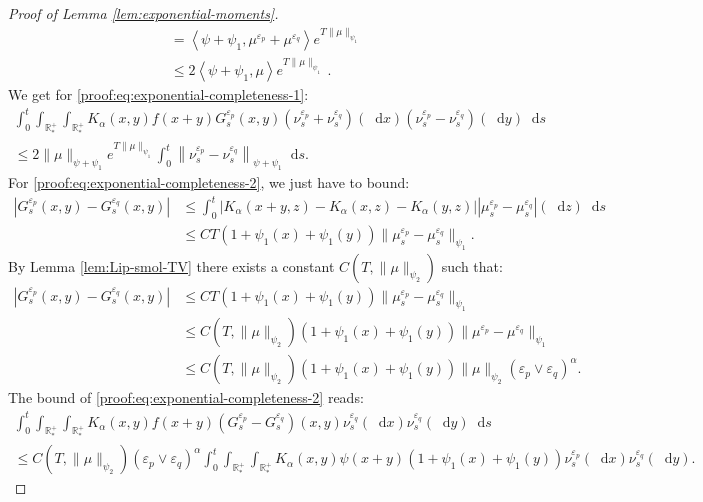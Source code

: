 \documentclass[11pt,a4paper]{article}
\newcommand{\RRP}{\mathbb{R}^+_*}
\newcommand{\brac}[1]{\left\langle#1\right\rangle}
\newcommand{\dd}{\mathop{}\!\mathrm{d}}
\begin{document}
\begin{proof}[Proof of Lemma \ref{lem:exponential-moments}]
\begin{align*}
        &= \brac{\psi + \psi_1, \mu^{\varepsilon_p} + \mu^{\varepsilon_q}}e^{T\|\mu\|_{\psi_1}} \\
        &\leq 2\brac{\psi + \psi_1, \mu}e^{T\|\mu\|_{\psi_1}}\ .
    \end{align*}
    We get for \eqref{proof:eq:exponential-completeness-1}:
    \begin{multline*}
        \int_0^t \int_{\RRP}\int_{\RRP}K_\alpha(x,y)f(x+y) G^{\varepsilon_p}_s(x,y)(\nu_s^{\varepsilon_p} + \nu_s^{\varepsilon_q})(\dd x)(\nu_s^{\varepsilon_p} -\nu_s^{\varepsilon_q} )(\dd y)\dd s \\
        \leq 2\| \mu\|_{\psi + \psi_1}e^{T\|\mu\|_{\psi_1}} \int_0^t \left\|\nu_s^{\varepsilon_p} - \nu_s^{\varepsilon_q} \right\|_{\psi + \psi_1} \dd s.
    \end{multline*}
    For \eqref{proof:eq:exponential-completeness-2}, we just have to bound:
    \begin{align*}
        \left| G^{\varepsilon_p}_s(x,y) - G^{\varepsilon_q}_s(x,y) \right| &\leq \int_0^t \left|K_\alpha(x+y,z) - K_\alpha(x,z) - K_\alpha(y,z)\right|\left|\mu_s^{\varepsilon_p} - \mu_s^{\varepsilon_q}\right|(\dd z) \dd s\\
        &\leq CT \left(1 + \psi_1(x) + \psi_1(y) \right)\| \mu_s^{\varepsilon_p} - \mu_s^{\varepsilon_q} \|_{\psi_1}.
    \end{align*}
    By Lemma \ref{lem:Lip-smol-TV} there exists a constant $ C\left(T,\|\mu\|_{\psi_2}\right)$ such that:
    \begin{align*}
        \left| G^{\varepsilon_p}_s(x,y) - G^{\varepsilon_q}_s(x,y) \right|
        &\leq CT \left(1 + \psi_1(x) + \psi_1(y) \right)\| \mu_s^{\varepsilon_p} - \mu_s^{\varepsilon_q} \|_{\psi_1}\\
        &\leq C\left(T,\|\mu\|_{\psi_2}\right) \left(1 + \psi_1(x) + \psi_1(y) \right)\| \mu^{\varepsilon_p} - \mu^{\varepsilon_q} \|_{\psi_1}\\
        &\leq C\left(T,\|\mu\|_{\psi_2}\right) \left(1 + \psi_1(x) + \psi_1(y) \right) \|\mu\|_{\psi_2} \left(\varepsilon_p \vee \varepsilon_q \right)^{\alpha}.
    \end{align*}
    The bound of \eqref{proof:eq:exponential-completeness-2} reads:
    \begin{multline*}
        \int_0^t\int_{\RRP}\int_{\RRP}K_\alpha(x,y)f(x+y) (G^{\varepsilon_p}_s - G^{\varepsilon_q}_s)(x,y)\nu_s^{\varepsilon_q}(\dd x)\nu_s^{\varepsilon_q}(\dd y) \dd s \\
        \leq C\left(T,\|\mu\|_{\psi_2}\right)\left(\varepsilon_p \vee \varepsilon_q \right)^{\alpha} \int_0^t \int_{\RRP} \int_{\RRP} K_\alpha(x,y)\psi(x+y)\left(1 + \psi_1(x) + \psi_1(y) \right)\nu_s^{\varepsilon_p}(\dd x)\nu_s^{\varepsilon_q}(\dd y).

\end{multline*}
\end{proof}
\end{document}
